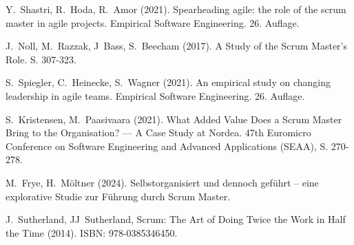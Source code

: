 \documentclass[5pt, final]{beamer}
\begin{document}
\begin{frame}[t]
\begin{multicols}{3}
\begin{thebibliography}{99}
				 Y.~Shastri, R.~Hoda, R.~Amor (2021). Spearheading agile: the role of the scrum master in agile projects. Empirical Software Engineering. 26. Auflage.
				
				 J.~Noll, M.~Razzak, J~Bass, S.~Beecham (2017). A Study of the Scrum Master's Role. S. 307-323.
				
				 S.~Spiegler, C.~Heinecke, S.~Wagner (2021). An empirical study on changing leadership in agile teams. Empirical Software Engineering. 26. Auflage.
				
				 S.~Kristensen, M.~Paasivaara (2021). What Added Value Does a Scrum Master Bring to the Organisation? — A Case Study at Nordea. 47th Euromicro Conference on Software Engineering and Advanced Applications (SEAA), S. 270-278.
				
				 M.~Frye, H.~Möltner (2024). Selbstorganisiert und dennoch geführt – eine explorative Studie zur Führung durch Scrum Master.
                
                 J.~Sutherland, JJ~Sutherland, Scrum: The Art of Doing Twice the Work in Half the Time (2014). ISBN: 978-0385346450.
				
			\end{thebibliography}
			
		\end{multicols}
		
	\end{frame}
\end{document}
